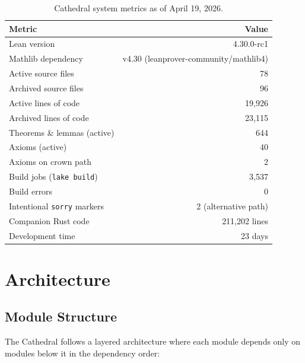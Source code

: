 \documentclass[11pt,a4paper]{article}
\theoremstyle{definition}
\begin{document}
\begin{table}[h]
\centering
\begin{tabular}{@{}lr@{}}
\toprule
\textbf{Metric} & \textbf{Value} \\
\midrule
Lean version & 4.30.0-rc1 \\
Mathlib dependency & v4.30 (leanprover-community/mathlib4) \\
Active source files & 78 \\
Archived source files & 96 \\
Active lines of code & 19,926 \\
Archived lines of code & 23,115 \\
Theorems \& lemmas (active) & 644 \\
Axioms (active) & 40 \\
Axioms on crown path & 2 \\
Build jobs (\texttt{lake build}) & 3,537 \\
Build errors & 0 \\
Intentional \texttt{sorry} markers & 2 (alternative path) \\
Companion Rust code & 211,202 lines \\
Development time & 23 days \\
\bottomrule
\end{tabular}
\caption{Cathedral system metrics as of April 19, 2026.}
\label{tab:metrics}
\end{table}

\section{Architecture}
\label{sec:architecture}

\subsection{Module Structure}

The Cathedral follows a layered architecture where each module depends
only on modules below it in the dependency order:
\end{document}
